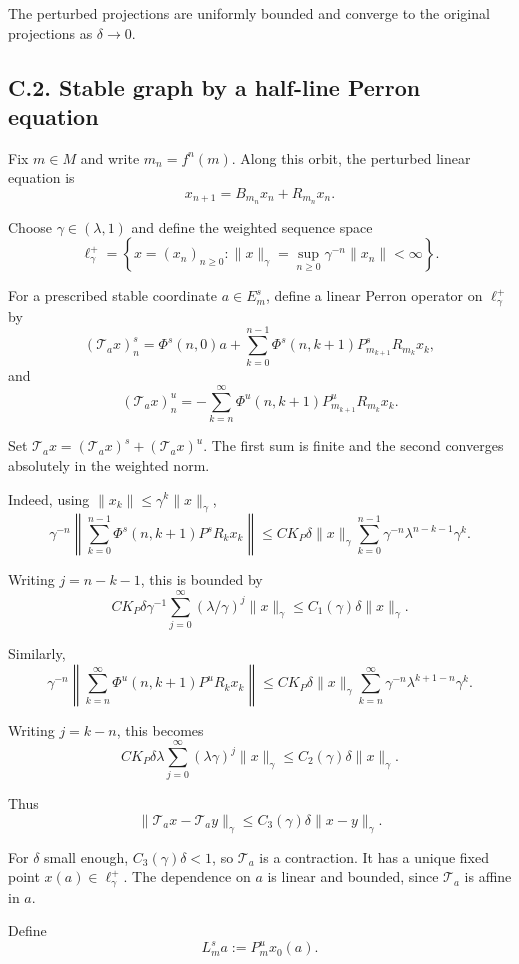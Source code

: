 \documentclass[12pt,a4paper]{article}
\theoremstyle{plain}
\numberwithin{equation}{section}
\numberwithin{theorem}{section}
\begin{document}
The perturbed projections are uniformly bounded and converge to the original projections as $\delta\to0$.

\subsection{C.2. Stable graph by a half-line Perron equation}

Fix $m\in M$ and write $m_n=f^n(m)$. Along this orbit, the perturbed linear equation is
\[
x_{n+1}=B_{m_n}x_n+R_{m_n}x_n.
\]

Choose $\gamma\in(\lambda,1)$ and define the weighted sequence space
\[
\ell_\gamma^+
=
\left\{
x=(x_n)_{n\ge0}:
\|x\|_\gamma=
\sup_{n\ge0}\gamma^{-n}\|x_n\|<\infty
\right\}.
\]

For a prescribed stable coordinate $a\in E_m^s$, define a linear Perron operator on $\ell_\gamma^+$ by
\[
(\mathcal T_a x)_n^s
=
\Phi^s(n,0)a
+
\sum_{k=0}^{n-1}
\Phi^s(n,k+1)P^s_{m_{k+1}}R_{m_k}x_k,
\]
and
\[
(\mathcal T_a x)_n^u
=
-
\sum_{k=n}^{\infty}
\Phi^u(n,k+1)P^u_{m_{k+1}}R_{m_k}x_k.
\]

Set $\mathcal T_a x=(\mathcal T_a x)^s+(\mathcal T_a x)^u$. The first sum is finite and the second converges absolutely in the weighted norm.

Indeed, using $\|x_k\|\le\gamma^k\|x\|_\gamma$,
\[
\gamma^{-n}
\left\|
\sum_{k=0}^{n-1}
\Phi^s(n,k+1)P^sR_kx_k
\right\|
\le
C K_P\delta\|x\|_\gamma
\sum_{k=0}^{n-1}
\gamma^{-n}\lambda^{n-k-1}
\gamma^k.
\]

Writing $j=n-k-1$, this is bounded by
\[
C K_P\delta\gamma^{-1}
\sum_{j=0}^{\infty}(\lambda/\gamma)^j
\|x\|_\gamma
\le
C_1(\gamma)\delta\|x\|_\gamma.
\]

Similarly,
\[
\gamma^{-n}
\left\|
\sum_{k=n}^{\infty}
\Phi^u(n,k+1)P^uR_kx_k
\right\|
\le
C K_P\delta\|x\|_\gamma
\sum_{k=n}^{\infty}
\gamma^{-n}\lambda^{k+1-n}
\gamma^k.
\]

Writing $j=k-n$, this becomes
\[
C K_P\delta\lambda
\sum_{j=0}^{\infty}(\lambda\gamma)^j
\|x\|_\gamma
\le
C_2(\gamma)\delta\|x\|_\gamma.
\]

Thus
\[
\|\mathcal T_a x-\mathcal T_a y\|_\gamma
\le
C_3(\gamma)\delta\|x-y\|_\gamma.
\]

For $\delta$ small enough, $C_3(\gamma)\delta<1$, so $\mathcal T_a$ is a contraction. It has a unique fixed point $x(a)\in\ell_\gamma^+$. The dependence on $a$ is linear and bounded, since $\mathcal T_a$ is affine in $a$.

Define
\[
L_m^s a:=P_m^u x_0(a).
\]
\end{document}
